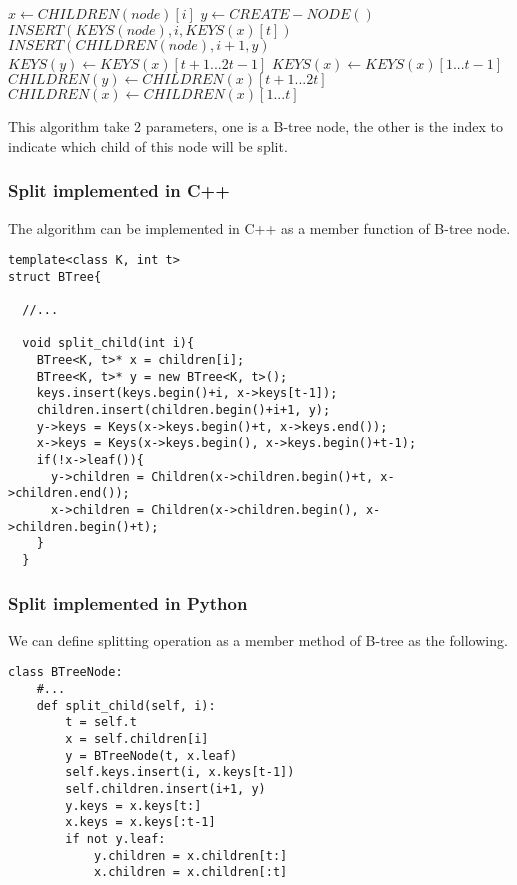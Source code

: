 \documentclass{article}
\begin{document}
\begin{algorithmic}[1]
  \State $x \leftarrow CHILDREN(node)[i]$
  \State $y \leftarrow CREATE-NODE()$
  \State $INSERT(KEYS(node), i, KEYS(x)[t])$
  \State $INSERT(CHILDREN(node), i+1, y)$
  \State $KEYS(y) \leftarrow KEYS(x)[t+1 ... 2t-1]$
  \State $KEYS(x) \leftarrow KEYS(x)[1 ... t-1]$
    \State $CHILDREN(y) \leftarrow CHILDREN(x)[t+1 ... 2t]$
    \State $CHILDREN(x) \leftarrow CHILDREN(x)[1 ... t]$
  \EndIf
\EndProcedure
\end{algorithmic}

This algorithm take 2 parameters, one is a B-tree node, the other
is the index to indicate which child of this node will be split.

\subsubsection*{Split implemented in C++}
The algorithm can be implemented in C++ as a member function of
B-tree node.

\lstset{language=C++}
\begin{lstlisting}
template<class K, int t>
struct BTree{

  //...

  void split_child(int i){
    BTree<K, t>* x = children[i];
    BTree<K, t>* y = new BTree<K, t>();
    keys.insert(keys.begin()+i, x->keys[t-1]);
    children.insert(children.begin()+i+1, y);
    y->keys = Keys(x->keys.begin()+t, x->keys.end());
    x->keys = Keys(x->keys.begin(), x->keys.begin()+t-1);
    if(!x->leaf()){
      y->children = Children(x->children.begin()+t, x->children.end());
      x->children = Children(x->children.begin(), x->children.begin()+t);
    }
  }
\end{lstlisting}

\subsubsection*{Split implemented in Python}
We can define splitting operation as a member method of B-tree
as the following.

\lstset{language=Python}
\begin{lstlisting}
class BTreeNode:
    #...
    def split_child(self, i):
        t = self.t
        x = self.children[i]
        y = BTreeNode(t, x.leaf)
        self.keys.insert(i, x.keys[t-1])
        self.children.insert(i+1, y)
        y.keys = x.keys[t:]
        x.keys = x.keys[:t-1]
        if not y.leaf:
            y.children = x.children[t:]
            x.children = x.children[:t]
\end{lstlisting}
\end{document}
